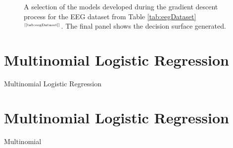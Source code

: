 \documentclass[xcolor={table}]{beamer}
\newcommand{\SectionSlideShortHeader}[3][]{
	\ifthenelse{\isempty{#1}}
		{\section[#3]{#2}\begin{frame} \begin{center}\begin{huge}#2\end{huge}\end{center}\end{frame}}
		{\section[#1]{#2}\begin{frame} \begin{center}\begin{huge}#3\end{huge}\end{center}\end{frame}}
}
\newcommand{\ourRef}[1]{\ref{#1} $^{\text{\tiny[\pageref{#1}]}}$}
\begin{document}
\begin{frame}
\begin{figure}[htb]
\begin{center}
\caption{A selection of the models developed during the gradient descent process for the EEG dataset from Table \ourRef{tab:eegDataset}. The final panel shows the decision surface generated.}
\label{fig:basisFunctionDemo2}
\end{center}
\end{figure}
\end{frame} 


\SectionSlideShortHeader{Multinomial Logistic Regression}{Multinomial}
\end{document}
